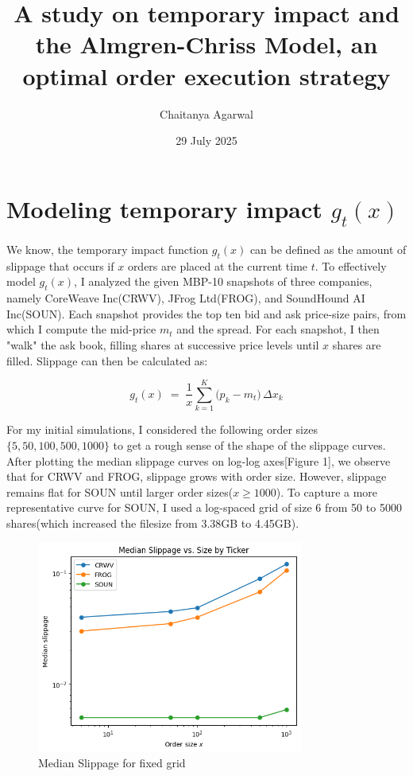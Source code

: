 \documentclass[12pt, letterpaper]{article}
\title{A study on temporary impact and the Almgren-Chriss Model, an optimal order execution strategy}
\author{Chaitanya Agarwal}
\date{29 July 2025}
\begin{document}
\maketitle


\section{Modeling temporary impact $g_t(x)$}

We know, the temporary impact function $g_t(x)$ can be defined as the amount of slippage that occurs if $x$ orders are placed at the current time $t$. To effectively model $g_t(x)$, I analyzed the given MBP-10 snapshots of three companies, namely CoreWeave Inc(CRWV), JFrog Ltd(FROG), and SoundHound AI Inc(SOUN). Each snapshot provides the top ten bid and ask price-size pairs, from which I compute the mid-price $m_t$ and the spread. For each snapshot, I then "walk" the ask book, filling shares at successive price levels until \(x\) shares are filled. Slippage can then be calculated as:

\[g_t(x) \;=\;\frac{1}{x}\sum_{k=1}^{K}\bigl(p_k - m_t\bigr)\,\Delta x_k\]



For my initial simulations, I considered the following order sizes \newline $\{5, 50, 100, 500, 1000\}$ to get a rough sense of the shape of the slippage curves. After plotting the median slippage curves on log-log axes[Figure 1], we observe that for CRWV and FROG, slippage grows with order size. 
However, slippage remains flat for SOUN until larger order sizes($x  \geq 1000$). To capture a more representative curve for SOUN, I used a log-spaced grid of size 6 from 50 to 5000 shares(which increased the filesize from 3.38GB to 4.45GB).



\begin{figure}[h!] %
    \centering
    \includegraphics[width=0.78\textwidth]{res/images/median_slippage_small_grid.png} %
    \caption{Median Slippage for fixed grid}
    \label{fig:slippage_fixed_grid}
\end{figure}
\end{document}
